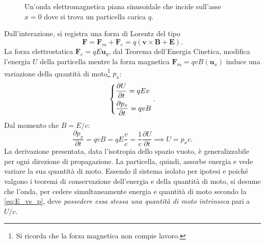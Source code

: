 \documentclass[a4paper,11pt]{report}
\begin{document}
\begin{figure}[h]
\label{fig:press_rad}
\caption{Un'onda elettromagnetica piana sinusoidale che incide sull'asse $x = 0$ dove si trova un particella carica $q$.}
\end{figure}
Dall'interazione, si registra una forza di Lorentz del tipo
\begin{equation}
\bm{F} = \bm{F}_m + \bm{F}_e = q(\bm{v} \times \bm{B} + \bm{E}).
\end{equation}
La forza elettrostatica $\bm{F}_e = qE \bm{u}_y$, dal Teorema dell'Energia Cinetica, modifica l'energia $U$ della particella mentre la forza magnetica $\bm{F}_m = qvB (\bm{u}_x)$ induce una variazione della quantità di moto\footnote{Si ricorda che la forza magnetica non compie lavoro.} $p_x$:
\begin{equation}
\begin{dcases}
\frac{\partial U}{\partial t} = qEv \\
\frac{\partial p_x}{\partial t} = qvB
\end{dcases}
.
\end{equation}
Dal momento che $B = E/c$:
\begin{equation}
\frac{\partial p_x}{\partial t} = qvB = qE \frac{v}{c} = \frac{1}{c} \frac{\partial U}{\partial t} \implies U = p_xc.
\label{eq:E_vs_p}
\end{equation}
La derivazione presentata, data l'isotropia dello spazio vuoto, è generalizzabile per ogni direzione di propagazione. La particella, quindi, assorbe energia e vede variare la sua quantità di moto. Essendo il sistema isolato per ipotesi e poiché valgono i teoremi di conservazione dell'energia e della quantità di moto, si desume che l'onda, per cedere simultaneamente energia e quantità di moto secondo la \eqref{eq:E_vs_p}, deve \textit{possedere essa stessa una quantità di moto intrinseca} pari a $U/c$. 
\end{document}
